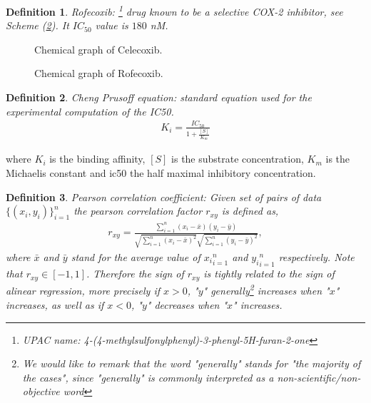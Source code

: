 \documentclass[11pt]{article}
\newtheorem{definition}{Definition}
\begin{document}
\begin{definition}\label{definitionRofecoxib}
Rofecoxib: \footnote{UPAC name: 4-(4-methylsulfonylphenyl)-3-phenyl-5H-furan-2-one} drug known to be a selective COX-2 inhibitor, see Scheme (\ref{RofecoxibFigure}). It $IC_{50}$ value is $180$ nM.
\end{definition}

\begin{figure}[H]
\captionsetup{type=scheme}
\centering
{}
\caption{Chemical graph of Celecoxib.}
\label{CelecoxibFigure}
\end{figure}

\begin{figure}[H]
\captionsetup{type=scheme}
\centering
{}
\caption{Chemical graph of Rofecoxib.}
\label{RofecoxibFigure}
\end{figure}
\begin{definition}\label{definitionChengPrusoff}
Cheng Prusoff equation: standard equation used for the experimental computation of the IC50.
	\begin{align*}
		K_i=\frac{IC_{50}}{1+\frac{[S]}{K_m}}
	\end{align*}
\end{definition}
where $K_i$ is the binding affinity, $[S]$ is the substrate concentration, $K_m$ is the Michaelis constant and \gls{ic50} the half maximal inhibitory concentration.

\begin{definition}\label{definitionPersonCoefficient}
Pearson correlation coefficient: Given set of pairs of data $\{(x_i,y_i)\}_{i=1}^n$ the pearson correlation factor $r_{xy}$ is defined as,
\begin{align}
r_{xy}=\frac{\sum_{i=1}^n(x_i-\bar{x})(y_i-\bar{y})}{\sqrt{\sum_{i=1}^n(x_i-\bar{x})^2}\sqrt{\sum_{i=1}^n(y_i-\bar{y})^2}},
\end{align}
where $\bar{x}$ and $\bar{y}$ stand for the average value of ${x_i}_{i=1}^n$ and ${y_i}_{i=1}^n$ respectively. Note that $r_{xy}\in[-1,1]$. Therefore the sign of $r_{xy}$ is tightly related to the sign of alinear regression, more precisely if $x>0$, "$y$" generally\footnote{We would like to remark that the word "generally" stands for "the majority of the cases", since "generally" is commonly interpreted as a non-scientific/non-objective word} increases when "$x$" increases, as well as if $x<0$, "$y$" decreases when "$x$" increases.
\end{definition}
\end{document}
